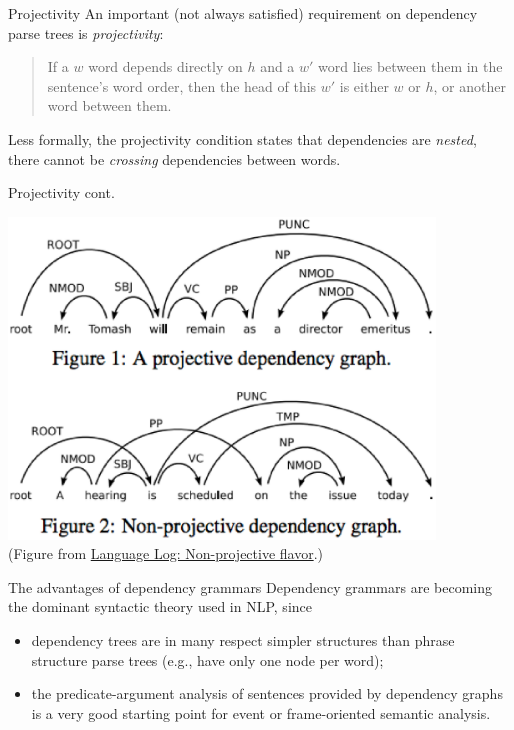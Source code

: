 \documentclass[style=upen, size=14pt]{powerdot}
\theoremstyle{definition}
\begin{document}
\begin{slide}{Projectivity}
  An important (not always satisfied) requirement on dependency parse trees is 
  \emph{projectivity}:
  \begin{quote}
    If a $w$ word depends directly on $h$ and a $w'$ word lies between them in
    the sentence's word order, then the head of this $w'$ is either $w$ or $h$,
    or another word between them.
  \end{quote}
  Less formally, the projectivity condition states that dependencies are
  \emph{nested}, there cannot be \emph{crossing} dependencies between words.
\end{slide}

\begin{slide}[toc=]{Projectivity cont.}
    \begin{center}
      \includegraphics[width=0.85\textwidth]{figures/projectivity.eps}\\
      \footnotesize{(Figure from
        \href{https://languagelog.ldc.upenn.edu/nll/?p=7851}{Language Log:
          Non-projective flavor}.)}
  \end{center}
\end{slide}

\begin{slide}[toc=Dep. advantages]{The advantages of dependency grammars}
  Dependency grammars are becoming the dominant syntactic theory used in NLP,
  since
  \begin{itemize}
  \item dependency trees are in many respect simpler structures than phrase
    structure parse trees (e.g., have only one node per word);
  \item the predicate-argument analysis of sentences provided by dependency
    graphs is a very good starting point for event or frame-oriented semantic
    analysis.
  \end{itemize}
\end{slide}
\end{document}
